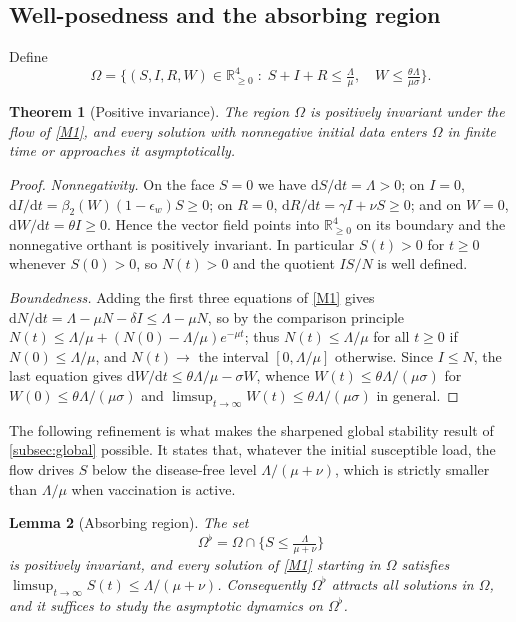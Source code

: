 \documentclass[11pt]{article}
\theoremstyle{plain}
\newtheorem{theorem}{Theorem}[section]
\newtheorem{lemma}[theorem]{Lemma}
\theoremstyle{definition}
\theoremstyle{remark}
\newcommand{\dd}{\mathrm{d}}
\begin{document}
\subsection{Well-posedness and the absorbing region}\label{sec:existence}

Define
\begin{equation}\label{eq:Omega}
\Omega=\Big\{(S,I,R,W)\in\mathbb{R}^4_{\ge0}\;:\;S+I+R\le \tfrac{\Lambda}{\mu},\quad W\le \tfrac{\theta\Lambda}{\mu\sigma}\Big\}.
\end{equation}

\begin{theorem}[Positive invariance]\label{thm:invariance}
The region $\Omega$ is positively invariant under the flow of \eqref{M1}, and every solution with nonnegative initial data enters $\Omega$ in finite time or approaches it asymptotically.
\end{theorem}

\begin{proof}
\emph{Nonnegativity.} On the face $S=0$ we have $\dd S/\dd t=\Lambda>0$; on $I=0$, $\dd I/\dd t=\beta_2(W)(1-\epsilon_w)S\ge0$; on $R=0$, $\dd R/\dd t=\gamma I+\nu S\ge0$; and on $W=0$, $\dd W/\dd t=\theta I\ge0$. Hence the vector field points into $\mathbb{R}^4_{\ge0}$ on its boundary and the nonnegative orthant is positively invariant. In particular $S(t)>0$ for $t\ge0$ whenever $S(0)>0$, so $N(t)>0$ and the quotient $IS/N$ is well defined.

\emph{Boundedness.} Adding the first three equations of \eqref{M1} gives $\dd N/\dd t=\Lambda-\mu N-\delta I\le \Lambda-\mu N$, so by the comparison principle $N(t)\le \Lambda/\mu+(N(0)-\Lambda/\mu)e^{-\mu t}$; thus $N(t)\le\Lambda/\mu$ for all $t\ge0$ if $N(0)\le\Lambda/\mu$, and $N(t)\to$ the interval $[0,\Lambda/\mu]$ otherwise. Since $I\le N$, the last equation gives $\dd W/\dd t\le \theta\Lambda/\mu-\sigma W$, whence $W(t)\le\theta\Lambda/(\mu\sigma)$ for $W(0)\le\theta\Lambda/(\mu\sigma)$ and $\limsup_{t\to\infty}W(t)\le\theta\Lambda/(\mu\sigma)$ in general.
\end{proof}

The following refinement is what makes the sharpened global stability result of \cref{subsec:global} possible. It states that, whatever the initial susceptible load, the flow drives $S$ below the disease-free level $\Lambda/(\mu+\nu)$, which is strictly smaller than $\Lambda/\mu$ when vaccination is active.

\begin{lemma}[Absorbing region]\label{lem:absorbing}
The set
\begin{equation}\label{eq:Omega1}
\Omega^{\flat}=\Omega\cap\Big\{S\le \tfrac{\Lambda}{\mu+\nu}\Big\}
\end{equation}
is positively invariant, and every solution of \eqref{M1} starting in $\Omega$ satisfies $\limsup_{t\to\infty}S(t)\le\Lambda/(\mu+\nu)$. Consequently $\Omega^\flat$ attracts all solutions in $\Omega$, and it suffices to study the asymptotic dynamics on $\Omega^\flat$.
\end{lemma}
\end{document}
